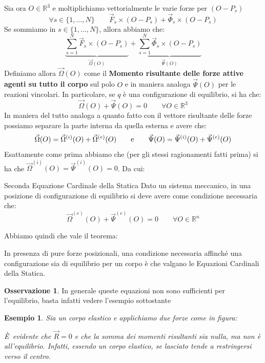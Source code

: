 \documentclass[11pt,a4paper,twoside]{article}
\newtheorem{es}{Esempio}
\theoremstyle{definition}
\newtheorem*{oss}{Osservazione}
\begin{document}
Sia ora $O \in \mathbb R^3$ e moltiplichiamo vettorialmente le varie forze per $(O-P_s)$
\[ \forall s \in \{1,...,N\}\qquad \vec F_s \times (O-P_s) + \vec \Phi_s \times (O-P_s) \]
Se sommiamo in $s \in \{1,...,N\}$, allora abbiamo che:
\[ \underbrace{\sum_{s = 1}^N \vec F_s \times (O-P_s)}_{\vec \Omega(O)} + \underbrace{\sum_{s = 1}^N \vec \Phi_s \times (O-P_s)}_{\vec \Psi(O)}\]
Definiamo allora $\vec \Omega(O)$ come il \textbf{Momento risultante delle forze attive agenti su tutto il corpo} sul polo $O$ e in maniera analoga $\vec \Psi(O)$ per le reazioni vincolari. In particolare, se $q$ è una configurazione di equilibrio, si ha che:
\[ \vec \Omega(O) + \vec \Psi(O) = 0 \qquad \forall O \in \mathbb R^3 \]
In maniera del tutto analoga a quanto fatto con il vettore risultante delle forze possiamo separare la parte interna da quella esterna e avere che:
\[ \vec \Omega(O) = \vec \Omega^{(i)}(O) + \vec \Omega^{(e)}(O)\qquad \text e \qquad \vec \Psi(O) = \vec \Psi^{(i)}(O) + \vec \Psi^{(e)}(O)  \]
Esattamente come prima abbiamo che (per gli stessi ragionamenti fatti prima) si ha che $\vec \Omega^{(i)}(O) = \vec \Psi^{(i)}(O) = 0$. Da cui:
\begin{thm}{Seconda Equazione Cardinale della Statica}{}
	Dato un sistema meccanico, in una posizione di configurazione di equilibrio si deve avere come condizione necessaria che:
	\[ \vec \Omega^{(e)}(O) + \vec \Psi^{(e)}(O) = 0 \qquad \forall O \in \mathbb R^n \]
\end{thm}

Abbiamo quindi che vale il teorema:

\begin{thm}{}{}\label{EqCardSta}
	In presenza di pure forze posizionali, una condizione necessaria affinché una configurazione sia di equilibrio per un corpo è che valgano le Equazioni Cardinali della Statica.
\end{thm}

\begin{oss}
	In generale queste equazioni non sono sufficienti per l'equilibrio, basta infatti vedere l'esempio sottostante
\end{oss}

\begin{es}
	Sia un corpo elastico e applichiamo due forze come in figura:
	\begin{center}
	\end{center}
	È evidente che $\vec R = 0$ e che la somma dei momenti risultanti sia nulla, ma non è all'equilibrio. Infatti, essendo un corpo elastico, se lasciato tende a restringersi verso il centro.
\end{es}
\end{document}
